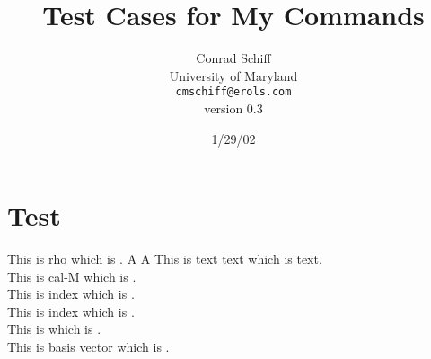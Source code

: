 \documentclass{article}
\begin{document}
\title{Test Cases for My Commands}
\author{Conrad Schiff \\
        University of Maryland\\
      \texttt{cmschiff@erols.com} \\
      version 0.3}
\date{1/29/02}
\maketitle
%
\section{Test}

This is rho \gr which is \gr \back.
\bes
  A \gr A
\ees
This is text text which is text. \\
This is cal-M \mM which is \mM \back. \\
This is index  which is  \back . \\
This is index  which is  \back .  \\
This is \met{\gm}{\gn} which is \met{\gm}{\gn} \back . \\
This is basis vector  \iback which is  \iback . \\
\end{document}
